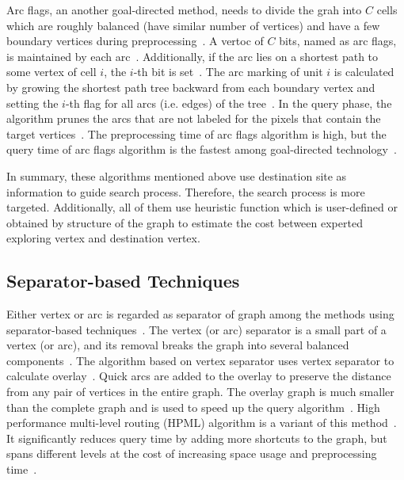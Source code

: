 \documentclass[conference]{IEEEtran}
\begin{document}
Arc flags, an another goal-directed method, needs to divide the grah into $C$ cells which are roughly balanced (have similar number of vertices) and have a few boundary vertices during preprocessing~\cite{hilger2009fast, lauther2006experimental}. A vertoc of $C$ bits, named as arc flags, is maintained by each arc~\cite{hilger2009fast, lauther2006experimental}. Additionally, if the arc lies on a shortest path to some vertex of cell $i$, the $i$-th bit is set~\cite{hilger2009fast, lauther2006experimental}. The arc marking of unit $i$ is calculated by growing the shortest path tree backward from each boundary vertex and setting the $i$-th flag for all arcs (i.e. edges) of the tree~\cite{hilger2009fast, lauther2006experimental}. In the query phase, the algorithm prunes the arcs that are not labeled for the pixels that contain the target vertices~\cite{bast2016route}. The preprocessing time of arc flags algorithm is high, but the query time of arc flags algorithm is the fastest among goal-directed technology~\cite{self_driving}.

In summary, these algorithms mentioned above use destination site as information to guide search process. Therefore, the search process is more targeted. Additionally, all of them use heuristic function which is user-defined or obtained by structure of the graph to estimate the cost between experted exploring vertex and destination vertex.

\subsection{Separator-based Techniques}
Either vertex or arc is regarded as separator of graph among the methods using separator-based techniques~\cite{self_driving}. The vertex (or arc) separator is a small part of a vertex (or arc), and its removal breaks the graph into several balanced components~\cite{bast2016route}. The algorithm based on vertex separator uses vertex separator to calculate overlay~\cite{bast2016route}. Quick arcs are added to the overlay to preserve the distance from any pair of vertices in the entire graph. The overlay graph is much smaller than the complete graph and is used to speed up the query algorithm~\cite{bast2016route}. High performance multi-level routing (HPML) algorithm is a variant of this method~\cite{delling2009high}. It significantly reduces query time by adding more shortcuts to the graph, but spans different levels at the cost of increasing space usage and preprocessing time~\cite{delling2009high}.
\end{document}

